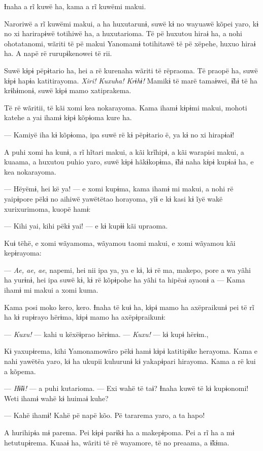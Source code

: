 Ɨnaha a rĩ kuwë ha, kama a rĩ kuwëmi makui. 

Naroriwë a rĩ kuwëmi makui, a ha huxutarunɨ, suwë kɨ no wayuawë kõpei
yaro, kɨ no xi harirapɨwë totihiwë ha, a huxutarioma. Të pë huxutou
hiraɨ ha, a nohi ohotatanomi, wãriti të pë makui Yanomamɨ totihitawë të
pë xëpehe, huxuo hiraɨ ha. A napë rë rurupɨkenowei të rii. 

Suwë kɨpɨ pëpɨtario ha, hei a rë kurenaha wãriti të rëpraoma. Të praopë
ha, suwë kɨpɨ hapɨa katitirayoma. \textit{Xiri! Kuxuha! Krɨhɨ!} Mamikɨ të marë
tamaɨwei, ɨ̃hɨ të ha krɨhɨmonɨ, suwë kɨpɨ mamo xatiprakema. 

Të rë wãritii, të kãi xomi kea nokarayoma. Kama ihamɨ kɨpɨmi makui,
mohoti katehe a yai ihamɨ kɨpɨ kõpɨoma kure ha. 

--- Kamiyë iha kɨ kõpɨoma, ipa suwë rë kɨ pëpɨtario ë, ya kɨ no xi
hirapɨaɨ! 

A puhi xomi ha kunɨ, a rĩ hĩtari makui, a kãi krĩhipɨ, a kãi warapisi
makui, a kuaama, a huxutou puhio yaro, suwë kɨpɨ hãkɨkopɨma, ɨ̃hɨ naha
kɨpɨ kupɨaɨ ha, e kea nokarayoma. 

--- Hëyëmɨ, hei kë ya! --- e xomi kupɨma, kama ihamɨ mi makui, a nohi rë
yaipɨpore pëkɨ no aihiwë yawëtëtao horayoma, yĩɨ e kɨ kasi kɨ ĩyë wakë
xurixurimoma, kuopë hamɨ: 

--- Kihi yai, kihi pëkɨ yai! --- e kɨ kupɨɨ kãi upraoma. 

Kuɨ tëhë, e xomi wãyamoma, wãyamou taomi makui, e xomi wãyamou kãi
kepɨrayoma: 

--- \textit{Ae, ae, ae}, napemi, hei nii ipa ya, ya e kɨ, kɨ rë ma, makepo, pore
a wa yãhi ha yurɨnɨ, hei ipa suwë kɨ, kɨ rë kõpɨpohe ha yãhi ta hipëaɨ
ayaonɨ a --- Kama ihamɨ mi makui a xomi kuma. 

Kama posi moko kero, kero. Ɨnaha të kuɨ ha, kɨpɨ mamo ha axëpraikunɨ pei
të rĩ ha kɨ rupɨrayo hërɨma, kɨpɨ mamo ha axëpɨpraikunɨ:

--- \textit{Kuxu!} --- kahi u këxëɨprao hërɨma. --- \textit{Kuxu!} --- kɨ kupɨ hërɨm., 

Kɨ yaxupɨrema, kihi Yamonamowãro pëkɨ hamɨ kɨpɨ katitipɨke herayoma.
Kama e nahi yawëtëa yaro, kɨ ha ukupii kuhurunɨ kɨ yakapɨpari hirayoma.
Kama a rë kui a kõpema. 

--- \textit{Hɨ̃ɨɨ!} --- a puhi kutarioma. --- Exi wahë të taɨ? Ɨnaha kuwë të kɨ
kupɨonomi! Weti ihamɨ wahë kɨ huimaɨ kuhe?

--- Kahë ihamɨ! Kahë pë napë kõo. Pë tararema yaro, a ta hapo! 

A hurihipɨa mɨ parema. Pei kɨpɨ parɨkɨ ha a makepɨpoma. Pei a rĩ ha a mɨ
hetutupɨrema. Kuaaɨ ha, wãriti të rë wayamore, të no preaama, a ɨ̃kɨma. 

